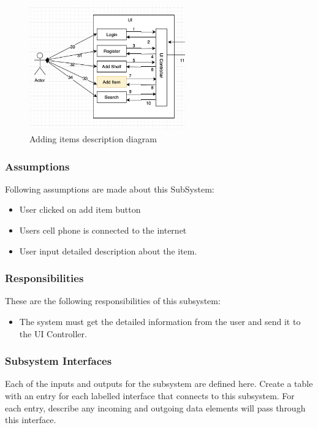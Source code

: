 \begin{figure}[h!]
	\centering
 	\includegraphics[width=0.60\textwidth]{images/additem}

 \caption{Adding items description diagram}

\end{figure}

\subsubsection{Assumptions}
Following assumptions are made about this SubSystem:
\begin{itemize}
    \item User clicked on add item button
    \item Users cell phone is connected to the internet
    \item User input detailed description about the item.
\end{itemize}

\subsubsection{Responsibilities}
These are the following responsibilities of this subsystem:
\begin{itemize}
    \item The system must get the detailed information from the user and send it to the UI Controller.
\end{itemize}

\subsubsection{Subsystem Interfaces}
Each of the inputs and outputs for the subsystem are defined here. Create a table with an entry for each labelled interface that connects to this subsystem. For each entry, describe any incoming and outgoing data elements will pass through this interface.

